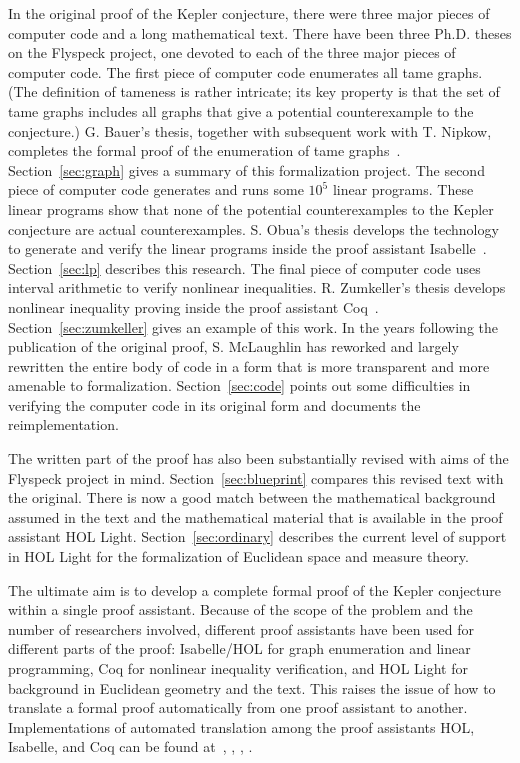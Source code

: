 \documentclass[11pt]{amsart}
\begin{document}
In the original proof of the Kepler conjecture, there were three major pieces of computer code and a long mathematical text.
There have been three Ph.D. theses on the Flyspeck
project, one devoted to each of the three major pieces of computer code.
The first piece of computer code enumerates all tame graphs.
(The definition of tameness is rather intricate; its key property is that the set of tame graphs 
includes all graphs that give a potential counterexample to the conjecture.)
G. Bauer's thesis, together with subsequent 
work with T. Nipkow, completes the formal
proof of the enumeration of tame graphs~\cite{NipkowBS-IJCAR06}.
Section~\ref{sec:graph} gives a summary of this formalization project.
The second piece of computer code generates and runs some $10^5$ linear
programs.   These linear programs show that none of the potential counterexamples
to the Kepler conjecture are actual counterexamples.  S. Obua's thesis develops the
technology to generate and verify the linear programs inside the proof assistant Isabelle~\cite{obua:phd}. 
Section~\ref{sec:lp} describes this research.
The final piece of computer code uses interval arithmetic to verify nonlinear inequalities.  R. Zumkeller's thesis develops nonlinear inequality proving inside the proof assistant Coq~\cite{roland-thesis}.  Section~\ref{sec:zumkeller} gives an example of this work.  In the years following the publication of the original proof, S. McLaughlin has  reworked and largely rewritten the entire body of code in a form that is more transparent and more amenable to formalization.  Section~\ref{sec:code} points out some difficulties
in verifying the computer code in its original form and
documents the reimplementation.

The written part of the proof has also been substantially revised with aims of the Flyspeck project in mind.   Section~\ref{sec:blueprint} compares this revised text with the original.  There is now a good match between the mathematical background assumed in the text and the mathematical material that is available in the proof assistant HOL Light.  Section~\ref{sec:ordinary} describes the current level of support in HOL Light for the formalization of Euclidean space and measure theory.

The ultimate aim is to develop a complete formal proof of the Kepler
conjecture within a single proof assistant.  Because of the scope of 
the problem and the number of researchers involved, different proof
assistants have been used for different parts of the proof:
Isabelle/HOL for graph enumeration and linear programming, Coq for
nonlinear inequality verification, and HOL Light for background
in Euclidean geometry and the text.  This raises the issue of how
to translate a formal proof automatically from one proof assistant to another.
Implementations of automated translation among the
proof assistants HOL, Isabelle, and Coq can be found 
at~\cite{obua:import}, \cite{McLaughlin:2006:IJCAR}, \cite{wiedijk:encoding},
\cite{695027}.
\end{document}
